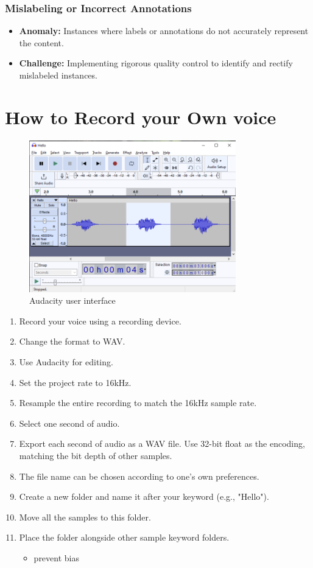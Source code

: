 \subsubsection{Mislabeling or Incorrect Annotations}

\begin{itemize}
	\item \textbf{Anomaly:} Instances where labels or annotations do not accurately represent the content.
	\item \textbf{Challenge:} Implementing rigorous quality control to identify and rectify mislabeled instances.
\end{itemize}


\section{How to Record your Own voice}

\begin{figure}[h!]
	\centering
	\includegraphics[width=0.8\textwidth]{Images/Data/EditRecordedinAudacity}
	\caption{Audacity user interface} \label{fig:Audacity}
\end{figure}

\begin{enumerate}
	\item Record your voice using a recording device.
	\item Change the format to WAV.
	\item Use Audacity for editing.
	\item Set the project rate to 16kHz.
	\item Resample the entire recording to match the 16kHz sample rate.
	\item Select one second of audio.
	\item Export each second of audio as a WAV file. Use 32-bit float as the encoding, matching the bit depth of other samples.
	\item The file name can be chosen according to one's own preferences.
	\item Create a new folder and name it after your keyword (e.g., "Hello").
	\item Move all the samples to this folder.
	\item Place the folder alongside other sample keyword folders.
	\begin{itemize}
		\item prevent bias
	\end{itemize}
\end{enumerate}

